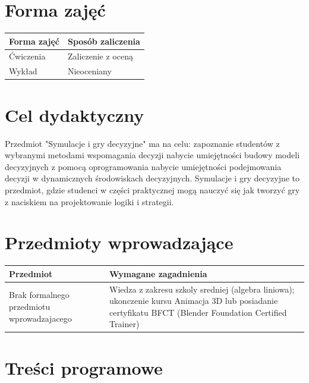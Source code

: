 \documentclass[12pt, a4paper]{article}
\begin{document}
\section{Forma zajęć}

\begin{tabular}{ll}
  \hline
  \textbf{Forma zajęć} & \textbf{Sposób zaliczenia} \\
  \hline
  Ćwiczenia & Zaliczenie z oceną \\
  Wykład & Nieoceniany \\
  \hline
\end{tabular}

\section{Cel dydaktyczny}

Przedmiot "Symulacje i gry decyzyjne" ma na celu: zapoznanie studentów z wybranymi metodami wspomagania decyzji nabycie umiejętności budowy modeli decyzyjnych z pomocą oprogramowania nabycie umiejętności podejmowania decyzji w dynamicznych środowiskach decyzyjnych. Symulacje i gry decyzyjne to przedmiot, gdzie studenci w części praktycznej mogą nauczyć się jak tworzyć gry z naciskiem na projektowanie logiki i strategii.

\section{Przedmioty wprowadzające}

\begin{tabularx}{\textwidth}{lX}
  \hline
  \textbf{Przedmiot} & \textbf{Wymagane zagadnienia} \\
  \hline
  Brak formalnego przedmiotu wprowadzajacego & Wiedza z zakresu szkoly sredniej (algebra liniowa); ukonczenie kursu Animacja 3D lub posiadanie certyfikatu BFCT (Blender Foundation Certified Trainer) \\
  \hline
\end{tabularx}

\section{Treści programowe}
\end{document}
